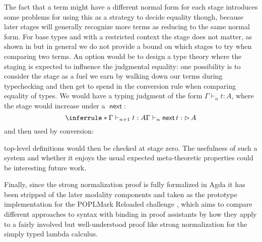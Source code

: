 \documentclass{book}
\DeclareMathOperator{\Later}{\vartriangleright}
\DeclareMathOperator{\next}{\ensuremath{\mathsf{next}}}
\begin{document}
  The fact that a term might have a different normal form for each
  stage introduces some problems for using this as a strategy to
  decide equality though, because later stages will generally
  recognize more terms as reducing to the same normal form.
  For base types and with a restricted context the stage does not
  matter, as shown in \cite{bahr:lics17} but in general we do
  not provide a bound on which stages to try when comparing two terms.
  An option would be to design a type theory where the staging is expected
  to influence the judgmental equality: one possibility is to consider
  the stage as a fuel we earn by walking down our terms during
  typechecking and then get to spend in the conversion rule when
  comparing equality of types.
  We would have a typing judgment of the form $\Gamma \vdash_n t : A$, where the stage would increase under a $\next$:
  \[
  \inferrule*{\Gamma \vdash_{n+1} t : A}
             {\Gamma \vdash_n \next t : \Later A}
  \]
  and then used by conversion:
  top-level definitions would then be checked at stage zero. The
  usefulness of such a system and whether it enjoys the usual expected
  meta-theoretic properties could be interesting future work.

  Finally, since the strong normalization proof is fully formalized in
  Agda it has been stripped of the later modality components and taken
  as the prototype implementation for the POPLMark Reloaded challenge
  \cite{pientka:cpp18},
  which aims to compare different approaches to syntax with binding in
  proof assistants by how they apply to a fairly involved but
  well-understood proof like strong normalization for the simply typed
  lambda calculus.

\end{document}
